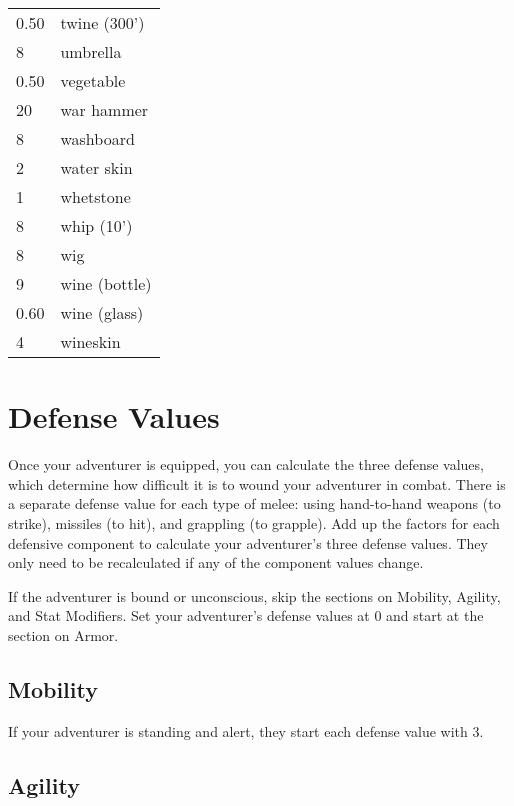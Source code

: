 \begin{normbox}[Equipment]
\begin{tabularx}{\linewidth}{@{} l X }
0.50 & twine (300')\\
8 & umbrella\\
0.50 & vegetable\\
20 & war hammer\\
8 & washboard\\
2 & water skin\\
1 & whetstone\\
8 & whip (10')\\
8 & wig\\
9 & wine (bottle)\\
0.60 & wine (glass)\\
4 & wineskin\\
\end{tabularx}
\end{normbox}

\section{Defense Values}


Once your adventurer is equipped, you can calculate the three defense values, which determine how difficult it is to wound your adventurer in combat. There is a separate defense value for each type of melee: using hand-to-hand weapons (to strike), missiles (to hit), and grappling (to grapple). Add up the factors for each defensive component to calculate your adventurer's three defense values. They only need to be recalculated if any of the component values change.

If the adventurer is bound or unconscious, skip the sections on Mobility, Agility, and Stat Modifiers. Set your adventurer's defense values at 0 and start at the section on Armor.
\subsection{Mobility}

If your adventurer is standing and alert, they start each defense value with 3.
\subsection{Agility}

